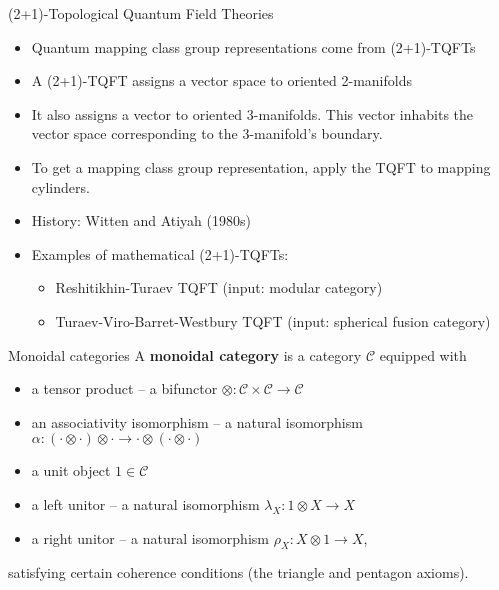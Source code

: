 \documentclass{beamer}
\begin{document}
\begin{frame}{(2+1)-Topological Quantum Field Theories}
\begin{itemize}
\item Quantum mapping class group representations come from (2+1)-TQFTs
\pause
\item A (2+1)-TQFT assigns a vector space to oriented 2-manifolds
\item It also assigns a vector to oriented 3-manifolds. This vector inhabits the vector space corresponding to the 3-manifold's boundary.
\item To get a mapping class group representation, apply the TQFT to mapping cylinders.
\pause
\item History: Witten and Atiyah (1980s)
\pause
\item Examples of mathematical (2+1)-TQFTs: 
\begin{itemize}
\item Reshitikhin-Turaev TQFT (input: modular category)
\item Turaev-Viro-Barret-Westbury TQFT (input: spherical fusion category)
\end{itemize}
\end{itemize}
\end{frame}

\begin{frame}{Monoidal categories}
A \textbf{monoidal category} is a category $\mathcal C$ equipped with
\begin{itemize}
\item a tensor product -- a  bifunctor $\otimes: \mathcal C \times \mathcal C \to \mathcal C$
\item an associativity isomorphism -- a natural isomorphism $\alpha: (\cdot \otimes \cdot) \otimes \cdot \to \cdot \otimes (\cdot \otimes \cdot)$ 
\item a unit object $1 \in \mathcal C$
\item a left unitor -- a natural isomorphism $\lambda_X: 1 \otimes X \to X$
\item a right unitor -- a natural isomorphism $\rho_X: X \otimes 1 \to X$,
\end{itemize}
satisfying certain coherence conditions (the triangle and pentagon axioms).
\end{frame}
\end{document}
